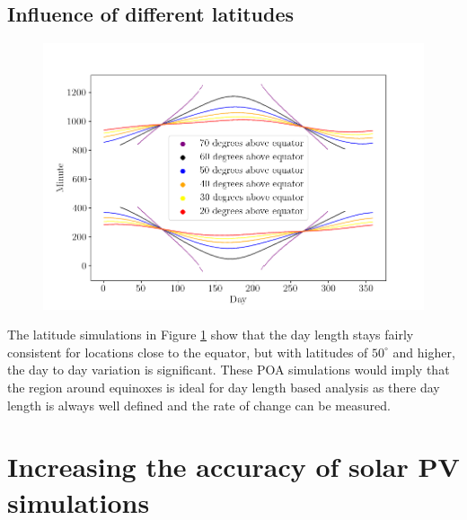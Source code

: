 



\newpage

\subsection{Influence of different latitudes}
\label{section_different_latitudes}

\begin{figure}[ht!]
\centering
\includegraphics[width=1\linewidth]{pics/poa_var_lat}
\label{fig_poa_var_lat}
\end{figure}

\noindent The latitude simulations in Figure \ref{fig_poa_var_lat} show that the day length stays fairly consistent for locations close to the equator, but with latitudes of $50^\circ$ and higher, the day to day variation is significant. These POA simulations would imply that the region around equinoxes is ideal for day length based analysis as there day length is always well defined and the rate of change can be measured. 


\newpage

\section{Increasing the accuracy of solar PV simulations}
\label{section_increased_accuracy_simulations}


